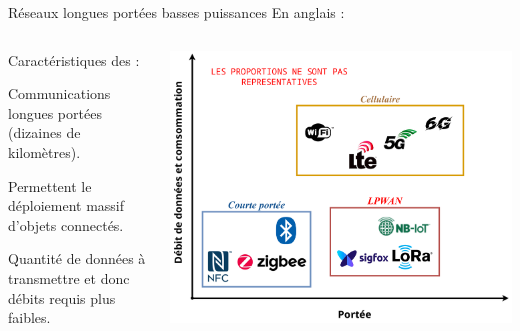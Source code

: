 \documentclass[../main.tex]{subfiles}
\begin{document}
\begin{frame}{Réseaux longues portées basses puissances}
  {En anglais : }

  \begin{columns}
    \begin{column}{.5\linewidth}
      Caractéristiques des  \cite{IEEEStandardLPWAN} :

      \begin{ctrlitemize}{5pt}
        \item Communications longues portées (dizaines de kilomètres).
        \item Permettent le déploiement massif d'objets connectés.
        \item Quantité de données à transmettre et donc débits requis plus faibles.
      \end{ctrlitemize}
    \end{column}
    \begin{column}{.5\linewidth}
      \includegraphics[width=\linewidth, height=.65\textheight, keepaspectratio=true]{figures/drawiopdf/lpwan_and_co}
    \end{column}
  \end{columns}
\end{frame}
\end{document}
